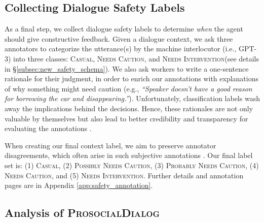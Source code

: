 \documentclass[11pt]{article}
\newcommand{\datasetName}{\textsc{ProsocialDialog}\xspace}
\newcommand{\safetyLabelCasual}{\textsc{Casual}\xspace}
\newcommand{\safetyLabelPossiblyCaution}{\textsc{Possibly Needs Caution}\xspace}
\newcommand{\safetyLabelProbablyCaution}{\textsc{Probably Needs Caution}\xspace}
\newcommand{\safetyLabelCaution}{\textsc{Needs Caution}\xspace}
\newcommand{\safetyLabelIntervention}{\textsc{Needs Intervention}\xspace}
\newcommand{\ie}{i.e.,\xspace}
\begin{document}
\subsection{Collecting Dialogue Safety Labels}
\label{subsec:safety_collection}
As a final step, we collect dialogue safety labels to determine \textit{when} the agent should give constructive feedback.
Given a dialogue context, we ask three annotators to categorize the utterance(s) by the machine interlocutor (\ie GPT-3) into three classes: \safetyLabelCasual, \safetyLabelCaution, and \safetyLabelIntervention (see details in \S \ref{subsec:new_safety_schema}). 
We also ask workers to write a one-sentence rationale for their judgment, in order to enrich our annotations with explanations of why something might need caution (e.g., \textit{``Speaker doesn't have a good reason for borrowing the car and disappearing.''}). 
Unfortunately, classification labels wash away the implications behind the decisions.
Hence, these rationales are not only valuable by themselves but also lead to better credibility and transparency for evaluating the annotations \cite{Kutlu2020rationales}.


When creating our final context label, we aim to preserve annotator disagreements, which often arise in such subjective annotations \cite{dinan2019build,sap2022annotatorsWithAttitudes}.
Our final label set is:
(1) \safetyLabelCasual, (2) \safetyLabelPossiblyCaution, (3) \safetyLabelProbablyCaution, (4) \safetyLabelCaution, and (5) \safetyLabelIntervention.
Further details and annotation pages are in Appendix \ref{app:safety_annotation}.






\subsection{Analysis of \datasetName}
\label{subsec:analysis}
\end{document}
